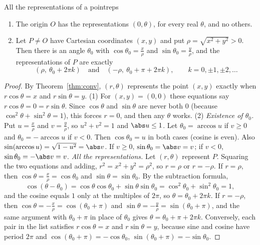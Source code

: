 \documentclass[11pt]{article}
\begin{document}
\begin{thm}{All the representations of a point}{reps}
\begin{enumerate}[nosep]
  \item The origin $O$ has the representations $(0,\theta)$, for every real $\theta$, and no others.
  \item Let $P\ne O$ have Cartesian coordinates $(x,y)$ and put $\rho=\sqrt{x^2+y^2}>0$. Then there is an angle $\theta_0$ with $\cos\theta_0=\frac x\rho$ and $\sin\theta_0=\frac y\rho$, and the representations of $P$ are exactly
  \[
  (\rho,\ \theta_0+2\pi k)\quad\text{and}\quad(-\rho,\ \theta_0+\pi+2\pi k),\qquad k=0,\pm1,\pm2,\dots
  \]
\end{enumerate}
\end{thm}
\begin{proof}
By Theorem~\ref{thm:conv}, $(r,\theta)$ represents the point $(x,y)$ exactly when $r\cos\theta=x$ and $r\sin\theta=y$.
(1) For $(x,y)=(0,0)$ these equations say $r\cos\theta=0=r\sin\theta$. Since $\cos\theta$ and $\sin\theta$ are never both $0$ (because $\cos^2\theta+\sin^2\theta=1$), this forces $r=0$, and then any $\theta$ works.
(2) \emph{Existence of $\theta_0$.} Put $u=\frac x\rho$ and $v=\frac y\rho$, so $u^2+v^2=1$ and $\abs u\le1$. Let $\theta_0=\arccos u$ if $v\ge0$ and $\theta_0=-\arccos u$ if $v<0$. Then $\cos\theta_0=u$ in both cases (cosine is even). Also $\sin(\arccos u)=\sqrt{1-u^2}=\abs v$. If $v\ge0$, $\sin\theta_0=\abs v=v$; if $v<0$, $\sin\theta_0=-\abs v=v$.
\emph{All the representations.} Let $(r,\theta)$ represent $P$. Squaring the two equations and adding, $r^2=x^2+y^2=\rho^2$, so $r=\rho$ or $r=-\rho$.
If $r=\rho$, then $\cos\theta=\frac x\rho=\cos\theta_0$ and $\sin\theta=\sin\theta_0$. By the subtraction formula,
\[
\cos(\theta-\theta_0)=\cos\theta\cos\theta_0+\sin\theta\sin\theta_0=\cos^2\theta_0+\sin^2\theta_0=1,
\]
and the cosine equals $1$ only at the multiples of $2\pi$, so $\theta=\theta_0+2\pi k$.
If $r=-\rho$, then $\cos\theta=-\frac x\rho=\cos(\theta_0+\pi)$ and $\sin\theta=-\frac y\rho=\sin(\theta_0+\pi)$, and the same argument with $\theta_0+\pi$ in place of $\theta_0$ gives $\theta=\theta_0+\pi+2\pi k$.
Conversely, each pair in the list satisfies $r\cos\theta=x$ and $r\sin\theta=y$, because sine and cosine have period $2\pi$ and $\cos(\theta_0+\pi)=-\cos\theta_0$, $\sin(\theta_0+\pi)=-\sin\theta_0$.
\end{proof}
\end{document}
